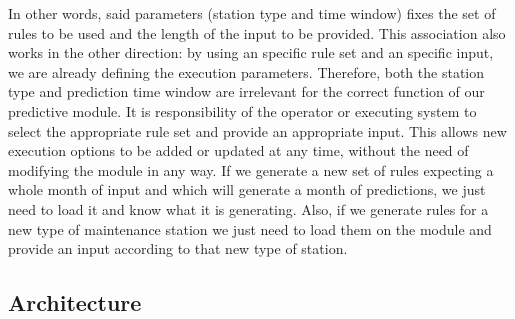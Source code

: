 \documentclass[a4paper,12pt]{article}
\begin{document}
In other words, said parameters (station type and time window) fixes the set of rules to be used and the length of the input to be provided. This association also works in the other direction: by using an specific rule set and an specific input, we are already defining the execution parameters. Therefore, both the station type and prediction time window are irrelevant for the correct function of our predictive module. It is responsibility of the operator or executing system to select the appropriate rule set and provide an appropriate input. This allows new execution options to be added or updated at any time, without the need of modifying the module in any way. If we generate a new set of rules expecting a whole month of input and which will generate a month of predictions, we just need to load it and know what it is generating. Also, if we generate rules for a new type of maintenance station we just need to load them on the module and provide an input according to that new type of station.

\subsection{Architecture}


 

\end{document}
